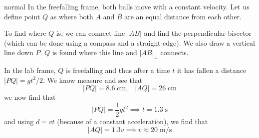 \begin{solution}{normal}
In the freefalling frame, both balls move with a constant velocity. Let us define point $Q$ as where both $A$ and $B$ are an equal distance from each other. 
\vspace{3mm}

To find where $Q$ is, we can connect line $|AB|$ and find the perpendicular bisector (which can be done using a compass and a straight-edge). We also draw a vertical line down $P$. $Q$ is found where this line and $|AB|_{\perp}$ connects. 
\vspace{3mm}

In the lab frame, $Q$ is freefalling and thus after a time $t$ it has fallen a distance $|PQ| = gt^2/2$. We know measure and see that 
\[|PQ| = 8.6\;\mathrm{cm},\hspace{10pt} |AQ| = 26\;\mathrm{cm}\]
we now find that 
\[|PQ| = \frac{1}{2}gt^2\implies t=1.3\;\mathrm{s}\]
and using $d = vt$ (because of a constant acceleration), we find that 
\[|AQ| = 1.3v\implies v \approx \boxed{20\;\mathrm{m/s}}\]
\end{solution}